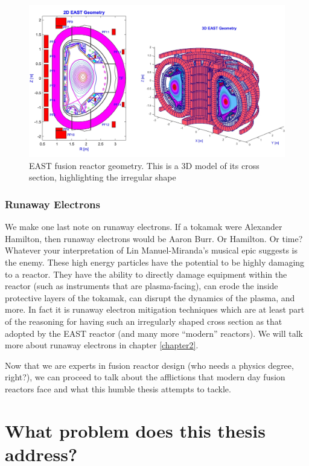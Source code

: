 \begin{figure}[h!]
    \centering
    \includegraphics[scale=0.2]{imgs/c1/east-cross-section.png}
    \caption{EAST fusion reactor geometry. This is a 3D model of its cross section, highlighting the irregular shape \cite{east-geometry-article}}
    \label{fig:east-geometry}
\end{figure}

\subsubsection{Runaway Electrons}
We make one last note on runaway electrons. If a tokamak were Alexander Hamilton, then runaway electrons would be Aaron Burr. Or Hamilton. Or time? 
Whatever your interpretation of Lin Manuel-Miranda's musical epic suggests is the enemy. These high energy particles have the 
potential to be highly damaging to a reactor. They have the ability to directly damage equipment within the reactor (such 
as instruments that are plasma-facing), can erode the inside protective layers of the tokamak, can 
disrupt the dynamics of the plasma, and more. In fact it is runaway electron mitigation 
techniques which are at least part of the reasoning for having such an irregularly shaped 
cross section as that adopted by the EAST reactor (and many more ``modern'' reactors). We will talk more about runaway electrons in chapter \ref{chapter2}.

Now that we are experts in fusion reactor design (who needs a physics degree, right?), we can proceed to talk about the 
afflictions that modern day fusion reactors face and what this humble thesis attempts to tackle.

\section{What problem does this thesis address?}

